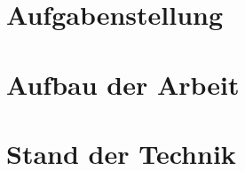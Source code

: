 \section{Aufgabenstellung}
\label{chap:Aufgabenstellung}
\section{Aufbau der Arbeit}
\label{chap:Aufbau der Arbeit}
\section{Stand der Technik}
\label{chap:Stand der Technik}